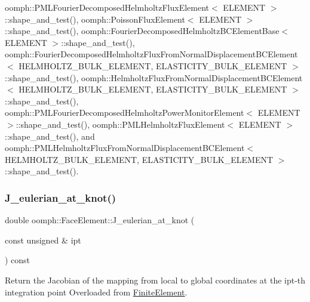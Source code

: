 oomph\+::\+P\+M\+L\+Fourier\+Decomposed\+Helmholtz\+Flux\+Element$<$ E\+L\+E\+M\+E\+N\+T $>$\+::shape\+\_\+and\+\_\+test(), oomph\+::\+Poisson\+Flux\+Element$<$ E\+L\+E\+M\+E\+N\+T $>$\+::shape\+\_\+and\+\_\+test(), oomph\+::\+Fourier\+Decomposed\+Helmholtz\+B\+C\+Element\+Base$<$ E\+L\+E\+M\+E\+N\+T $>$\+::shape\+\_\+and\+\_\+test(), oomph\+::\+Fourier\+Decomposed\+Helmholtz\+Flux\+From\+Normal\+Displacement\+B\+C\+Element$<$ H\+E\+L\+M\+H\+O\+L\+T\+Z\+\_\+\+B\+U\+L\+K\+\_\+\+E\+L\+E\+M\+E\+N\+T, E\+L\+A\+S\+T\+I\+C\+I\+T\+Y\+\_\+\+B\+U\+L\+K\+\_\+\+E\+L\+E\+M\+E\+N\+T $>$\+::shape\+\_\+and\+\_\+test(), oomph\+::\+Helmholtz\+Flux\+From\+Normal\+Displacement\+B\+C\+Element$<$ H\+E\+L\+M\+H\+O\+L\+T\+Z\+\_\+\+B\+U\+L\+K\+\_\+\+E\+L\+E\+M\+E\+N\+T, E\+L\+A\+S\+T\+I\+C\+I\+T\+Y\+\_\+\+B\+U\+L\+K\+\_\+\+E\+L\+E\+M\+E\+N\+T $>$\+::shape\+\_\+and\+\_\+test(), oomph\+::\+P\+M\+L\+Fourier\+Decomposed\+Helmholtz\+Power\+Monitor\+Element$<$ E\+L\+E\+M\+E\+N\+T $>$\+::shape\+\_\+and\+\_\+test(), oomph\+::\+P\+M\+L\+Helmholtz\+Flux\+Element$<$ E\+L\+E\+M\+E\+N\+T $>$\+::shape\+\_\+and\+\_\+test(), and oomph\+::\+P\+M\+L\+Helmholtz\+Flux\+From\+Normal\+Displacement\+B\+C\+Element$<$ H\+E\+L\+M\+H\+O\+L\+T\+Z\+\_\+\+B\+U\+L\+K\+\_\+\+E\+L\+E\+M\+E\+N\+T, E\+L\+A\+S\+T\+I\+C\+I\+T\+Y\+\_\+\+B\+U\+L\+K\+\_\+\+E\+L\+E\+M\+E\+N\+T $>$\+::shape\+\_\+and\+\_\+test().

\mbox{\label{classoomph_1_1FaceElement_aa6380a08afc18bd4f35e337a1131a9d8}} 
\subsubsection{\texorpdfstring{J\+\_\+eulerian\+\_\+at\+\_\+knot()}{J\_eulerian\_at\_knot()}}
{\footnotesize\ttfamily double oomph\+::\+Face\+Element\+::\+J\+\_\+eulerian\+\_\+at\+\_\+knot (\begin{DoxyParamCaption}\item[{const unsigned \&}]{ipt }\end{DoxyParamCaption}) const\hspace{0.3cm}{\ttfamily [virtual]}}



Return the Jacobian of the mapping from local to global coordinates at the ipt-\/th integration point Overloaded from \hyperlink{classoomph_1_1FiniteElement}{Finite\+Element}. 


